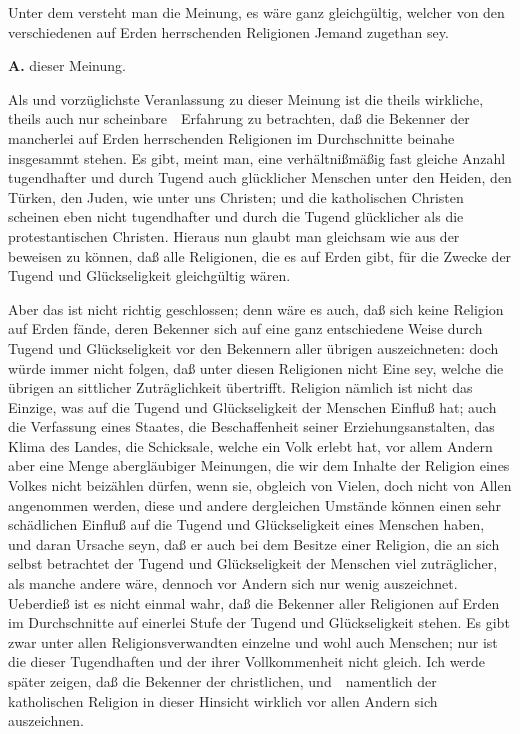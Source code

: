 Unter dem  versteht man die Meinung, es wäre ganz gleichgültig, welcher von den verschiedenen auf Erden herrschenden Religionen Jemand zugethan sey.\par
\vabst \textbf{A.}  dieser Meinung.
\begin{aufza} 
\item Als  und vorzüglichste Veranlassung zu dieser Meinung ist die theils wirkliche, theils auch nur scheinbare~\ Erfahrung zu betrachten, daß die Bekenner der mancherlei auf Erden herrschenden Religionen im Durchschnitte beinahe insgesammt  stehen. Es gibt, meint man, eine verhältnißmäßig fast gleiche Anzahl tugendhafter und durch Tugend auch glücklicher Menschen unter den Heiden, den Türken, den Juden, wie unter uns Christen; und die katholischen Christen scheinen eben nicht tugendhafter und durch die Tugend glücklicher als die protestantischen Christen. Hieraus nun glaubt man gleichsam wie aus der  beweisen zu können, daß alle Religionen, die es auf Erden gibt, für die Zwecke der Tugend und Glückseligkeit gleichgültig wären.
\begin{RWanm} 
Aber das ist nicht richtig geschlossen; denn wäre es auch, daß sich keine Religion auf Erden fände, deren Bekenner sich auf eine ganz entschiedene Weise durch Tugend und Glückseligkeit vor den Bekennern aller übrigen auszeichneten: doch würde immer nicht folgen, daß unter diesen Religionen nicht Eine sey, welche die übrigen an sittlicher Zuträglichkeit übertrifft. Religion nämlich ist nicht das Einzige, was auf die Tugend und Glückseligkeit der Menschen Einfluß hat; auch die Verfassung eines Staates, die Beschaffenheit seiner Erziehungsanstalten, das Klima des Landes, die Schicksale, welche ein Volk erlebt hat, vor allem Andern aber eine Menge abergläubiger Meinungen, die wir dem Inhalte der Religion eines Volkes nicht beizählen dürfen, wenn sie, obgleich von Vielen, doch nicht von Allen angenommen werden, diese und andere dergleichen Umstände können einen sehr schädlichen Einfluß auf die Tugend und Glückseligkeit eines Menschen haben, und daran Ursache seyn, daß er auch bei dem Besitze einer Religion, die an sich selbst betrachtet der Tugend und Glückseligkeit der Menschen viel zuträglicher, als manche andere wäre, dennoch vor Andern sich nur wenig auszeichnet. Ueberdieß ist es nicht einmal wahr, daß die Bekenner aller Religionen auf Erden im Durchschnitte auf einerlei Stufe der Tugend und Glückseligkeit stehen. Es gibt zwar unter allen Religionsverwandten einzelne  und wohl auch  Menschen; nur ist die  dieser Tugendhaften und der  ihrer Vollkommenheit nicht gleich. Ich werde später zeigen, daß die Bekenner der christlichen, und~\ namentlich der katholischen Religion in dieser Hinsicht wirklich vor allen Andern sich auszeichnen.

\end{RWanm}
\end{aufza}
